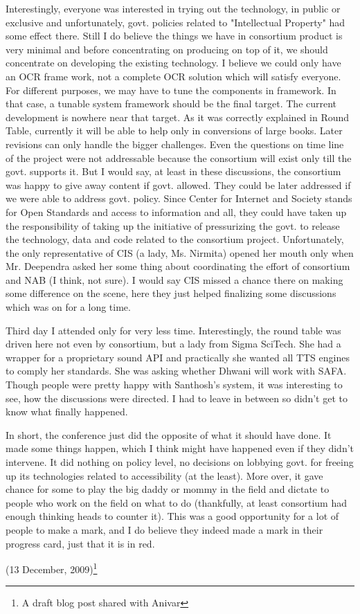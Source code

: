  
Interestingly, everyone was interested in trying out the technology, in public or exclusive and unfortunately, govt. policies related to "Intellectual Property" had some effect there. Still I do believe the things we have in consortium product is very minimal and before concentrating on producing on top of it, we should concentrate on developing the existing technology. I believe we could only have an OCR frame work, not a complete OCR solution which will satisfy everyone. For different purposes, we may have to tune the components in framework. In that case, a tunable system framework should be the final target. The current development is nowhere near that target. As it was correctly explained in Round Table, currently it will be able to help only in conversions of large books. Later revisions can only handle the bigger challenges. Even the questions on time line of the project were not addressable because the consortium will exist only till the govt. supports it. But I would say, at least in these discussions, the consortium was happy to give away content if govt. allowed. They could be later addressed if we were able to address govt. policy. Since Center for Internet and Society stands for Open Standards and access to information and all, they could have taken up the responsibility of taking up the initiative of pressurizing the govt. to release the technology, data and code related to the consortium project. Unfortunately, the only representative of CIS (a lady, Ms. Nirmita) opened her mouth only when Mr. Deependra asked her some thing about coordinating the effort of consortium and NAB (I think, not sure). I would say CIS missed a chance there on making some difference on the scene, here they just helped finalizing some discussions which was on for a long time.

Third day I attended only for very less time. Interestingly, the round table was driven here not even by consortium, but a lady from Sigma SciTech. She had a wrapper for a proprietary sound API and practically she wanted all TTS engines to comply her standards. She was asking whether Dhwani will work with SAFA. Though people were pretty happy with Santhosh's system, it was interesting to see, how the discussions were directed. I had to leave in between so didn't get to know what finally happened. 

In short, the conference just did the opposite of what it should have done. It made some things happen, which I think might have happened even if they didn't intervene. It did nothing on policy level, no decisions on lobbying govt. for freeing up its technologies related to accessibility (at the least). More over, it gave chance for some to play the big daddy or mommy in the field and dictate to people who work on the field on what to do (thankfully, at least consortium had enough thinking heads to counter it). This was a good opportunity for a lot of people to make a mark, and I do believe they indeed made a mark in their progress card, just that it is in red.

\begin{flushright}(13 December, 2009)\footnote{A draft blog post shared with Anivar}\end{flushright}

\newpage
